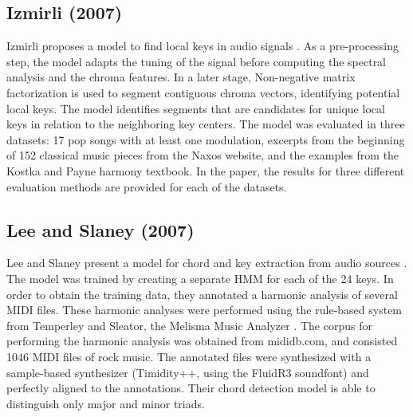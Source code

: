 \subsection{Izmirli (2007)}

Izmirli proposes a model to find local keys in audio signals \cite{izmirli2007localized}. As a pre-processing step, the model adapts the tuning of the signal before computing the spectral analysis and the chroma features. In a later stage, Non-negative matrix factorization is used to segment contiguous chroma vectors, identifying potential local keys. The model identifies segments that are candidates for unique local keys in relation to the neighboring key centers. The model was evaluated in three datasets: 17 pop songs with at least one modulation, excerpts from the beginning of 152 classical music pieces from the Naxos website, and the examples from the Kostka and Payne harmony textbook. In the paper, the results for three different evaluation methods are provided for each of the datasets.

\subsection{Lee and Slaney (2007)}
Lee and Slaney present a model for chord and key extraction from audio sources \cite{lee2007unified}. The model was trained by creating a separate HMM for each of the 24 keys. In order to obtain the training data, they annotated a harmonic analysis of several MIDI files. These harmonic analyses were performed using the rule-based system from Temperley and Sleator, the Melisma Music Analyzer \cite{temperley2004cognition}. The corpus for performing the harmonic analysis was obtained from mididb.com, and consisted 1046 MIDI files of rock music. The annotated files were synthesized with a sample-based synthesizer (Timidity++, using the FluidR3 soundfont) and perfectly aligned to the annotations. Their chord detection model is able to distinguish only major and minor triads.



